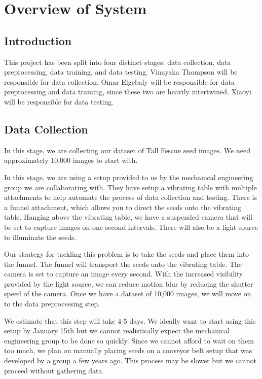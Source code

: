\documentclass[onecolumn, draftclsnofoot,10pt, compsoc]{IEEEtran}
\begin{document}
\section{Overview of System}
\subsection{Introduction}

This project has been split into four distinct stages: data collection, data preprocessing, data training, and data testing. Vinayaka Thompson will be responsible for data collection. Omar Elgebaly will be responsible for data preprocessing and data training, since these two are heavily intertwined. Xiaoyi will be responsible for data testing. 

\subsection{Data Collection}
In this stage, we are collecting our dataset of Tall Fescue seed images. We need approximately 10,000 images to start with. 

In this stage, we are using a setup provided to us by the mechanical engineering group we are collaborating with. They have setup a vibrating table with multiple attachments to help automate the process of data collection and testing. There is a funnel attachment, which allows you to direct the seeds onto the vibrating table. Hanging above the vibrating table, we have a suspended camera that will be set to capture images on one second intervals. There will also be a light source to illuminate the seeds.

Our strategy for tackling this problem is to take the seeds and place them into the funnel. The funnel will transport the seeds onto the vibrating table. The camera is set to capture an image every second. With the increased visibility provided by the light source, we can reduce motion blur by reducing the shutter speed of the camera. Once we have a dataset of 10,000 images, we will move on to the data preprocessing step. 

We estimate that this step will take 4-5 days. We ideally want to start using this setup by January 15th but we cannot realistically expect the mechanical engineering group to be done so quickly. Since we cannot afford to wait on them too much, we plan on manually placing seeds on a conveyor belt setup that was developed by a group a few years ago. This process may be slower but we cannot proceed without gathering data. 
\end{document}

